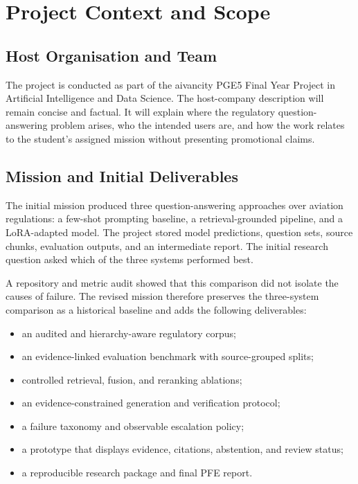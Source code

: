 \chapter{Project Context and Scope}
\label{chap:context}

\section{Host Organisation and Team}


The project is conducted as part of the aivancity PGE5 Final Year Project in Artificial Intelligence and Data Science. The host-company description will remain concise and factual. It will explain where the regulatory question-answering problem arises, who the intended users are, and how the work relates to the student's assigned mission without presenting promotional claims.

\section{Mission and Initial Deliverables}

The initial mission produced three question-answering approaches over aviation regulations: a few-shot prompting baseline, a retrieval-grounded pipeline, and a \ac{LoRA}-adapted model. The project stored model predictions, question sets, source chunks, evaluation outputs, and an intermediate report. The initial research question asked which of the three systems performed best.

A repository and metric audit showed that this comparison did not isolate the causes of failure. The revised mission therefore preserves the three-system comparison as a historical baseline and adds the following deliverables:

\begin{itemize}
  \item an audited and hierarchy-aware regulatory corpus;
  \item an evidence-linked evaluation benchmark with source-grouped splits;
  \item controlled retrieval, fusion, and reranking ablations;
  \item an evidence-constrained generation and verification protocol;
  \item a failure taxonomy and observable escalation policy;
  \item a prototype that displays evidence, citations, abstention, and review status;
  \item a reproducible research package and final PFE report.
\end{itemize}

